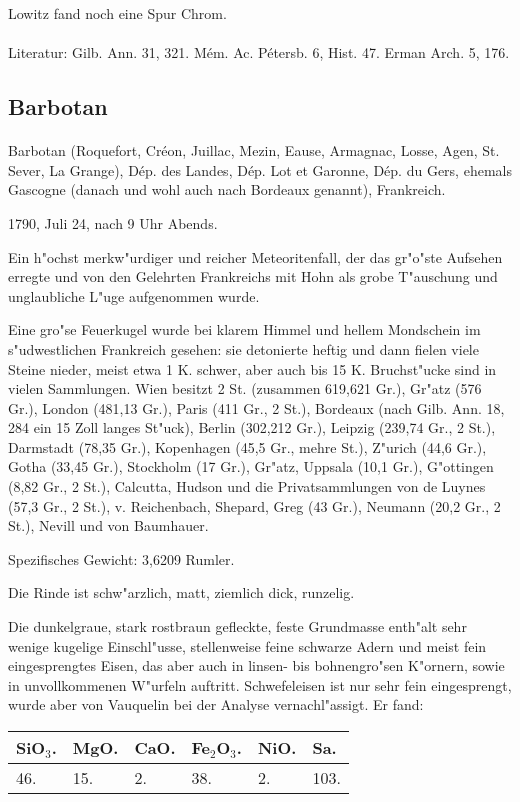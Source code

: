 \documentclass[a4paper, 11pt, oneside]{article}
\begin{document}
Lowitz fand noch eine Spur Chrom.
\footnotesize
\paragraph{}
Literatur: Gilb. Ann. 31, 321. Mém. Ac. Pétersb. 6, Hist. 47. Erman Arch. 5, 176.
\subsection{Barbotan}
\normalsize
\paragraph{}
Barbotan (Roquefort, Créon, Juillac, Mezin, Eause, Armagnac, Losse, Agen, St. Sever, La Grange), Dép. des Landes, Dép. Lot et Garonne, Dép. du Gers, ehemals Gascogne (danach und wohl auch nach Bordeaux genannt), Frankreich.

1790, Juli 24, nach 9 Uhr Abends.

Ein h"ochst merkw"urdiger und reicher Meteoritenfall, der das gr"o"ste Aufsehen erregte und von den Gelehrten Frankreichs mit Hohn als grobe T"auschung und unglaubliche L"uge aufgenommen wurde.

Eine gro"se Feuerkugel wurde bei klarem Himmel und hellem Mondschein im s"udwestlichen Frankreich gesehen: sie detonierte heftig und dann fielen viele Steine nieder, meist etwa 1 K. schwer, aber auch bis 15 K. Bruchst"ucke sind in vielen Sammlungen. Wien besitzt 2 St. (zusammen 619,621 Gr.), Gr"atz (576 Gr.), London (481,13 Gr.), Paris (411 Gr., 2 St.), Bordeaux (nach Gilb. Ann. 18, 284 ein 15 Zoll langes St"uck), Berlin (302,212 Gr.), Leipzig (239,74 Gr., 2 St.), Darmstadt (78,35 Gr.), Kopenhagen (45,5 Gr., mehre St.), Z"urich (44,6 Gr.), Gotha (33,45 Gr.), Stockholm (17 Gr.), Gr"atz, Uppsala (10,1 Gr.), G"ottingen (8,82 Gr., 2 St.), Calcutta, Hudson und die Privatsammlungen von de Luynes (57,3 Gr., 2 St.), v. Reichenbach, Shepard, Greg (43 Gr.), Neumann (20,2 Gr., 2 St.), Nevill und von Baumhauer.

Spezifisches Gewicht: 3,6209 Rumler.

Die Rinde ist schw"arzlich, matt, ziemlich dick, runzelig.

Die dunkelgraue, stark rostbraun gefleckte, feste Grundmasse enth"alt sehr wenige kugelige Einschl"usse, stellenweise feine schwarze Adern und meist fein eingesprengtes Eisen, das aber auch in linsen- bis bohnengro"sen K"ornern, sowie in unvollkommenen W"urfeln auftritt. Schwefeleisen ist nur sehr fein eingesprengt, wurde aber von Vauquelin bei der Analyse vernachl"assigt. Er fand:
\begin{table}[!ht]
    \centering
    \begin{tabular}{l l l l l l}
        SiO$_{3}$. & MgO. & CaO. & Fe$_{2}$O$_{3}$. & NiO. & Sa. \\ \hline
        46. & 15. & 2. & 38. & 2. & 103. \\
    \end{tabular}
\end{table}
\end{document}
